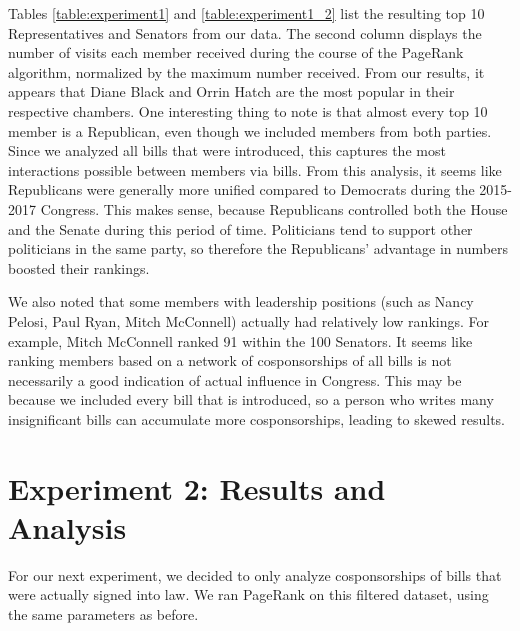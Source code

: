 \documentclass[11pt]{article}
\begin{document}
Tables \ref{table:experiment1} and \ref{table:experiment1_2} list the resulting top 10 Representatives and Senators from our data. The second column displays the number of visits each member received during the course of the PageRank algorithm, normalized by the maximum number received. From our results, it appears that Diane Black and Orrin Hatch are the most popular in their respective chambers. One interesting thing to note is that almost every top 10 member is a Republican, even though we included members from both parties. Since we analyzed all bills that were introduced, this captures the most interactions possible between members via bills. From this analysis, it seems like Republicans were generally more unified compared to Democrats during the 2015-2017 Congress. This makes sense, because Republicans controlled both the House and the Senate during this period of time. Politicians tend to support other politicians in the same party, so therefore the Republicans' advantage in numbers boosted their rankings. 

We also noted that some members with leadership positions (such as Nancy Pelosi, Paul Ryan, Mitch McConnell) actually had relatively low rankings. For example, Mitch McConnell ranked 91 within the 100 Senators. It seems like ranking members based on a network of cosponsorships of all bills is not necessarily a good indication of actual influence in Congress. This may be because we included every bill that is introduced, so a person who writes many insignificant bills can accumulate more cosponsorships, leading to skewed results.

\section*{Experiment 2: Results and Analysis}
For our next experiment, we decided to only analyze cosponsorships of bills that were actually signed into law. We ran PageRank on this filtered dataset, using the same parameters as before. 
\end{document}
